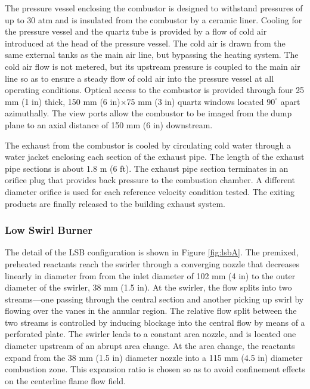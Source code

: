 The pressure vessel enclosing the combustor is designed to withstand pressures of up to 30 atm and is insulated from the combustor by a ceramic liner.
Cooling for the pressure vessel and the quartz tube is provided by a flow of cold air introduced at the head of the pressure vessel.
The cold air is drawn from the same external tanks as the main air line, but bypassing the heating system.
The cold air flow is not metered, but its upstream pressure is coupled to the main air line so as to ensure a steady flow of cold air into the pressure vessel at all operating conditions.
Optical access to the combustor is provided through four 25 mm (1 in) thick, 150 mm (6 in)\(\times\)75 mm (3 in) quartz windows located \(90^\circ\) apart azimuthally.
The view ports allow the combustor to be imaged from the dump plane to an axial distance of 150 mm (6 in) downstream.

The exhaust from the combustor is cooled by circulating cold water through a water jacket enclosing each section of the exhaust pipe.
The length of the exhaust pipe sections is about 1.8 m (6 ft).
The exhaust pipe section terminates in an orifice plug that provides back pressure to the combustion chamber.
A different diameter orifice is used for each reference velocity condition tested.
The exiting products are finally released to the building exhaust system.

\subsubsection{Low Swirl Burner}
\label{subsubsec:configuration-a-low-swirl-burner}



The detail of the LSB configuration is shown in Figure \ref{fig:lsbA}.
The premixed, preheated reactants reach the swirler through a converging nozzle that decreases linearly in diameter from from the inlet diameter of 102 mm (4 in) to the outer diameter of the swirler, 38 mm (1.5 in).
At the swirler, the flow splits into two streams---one passing through the central section and another picking up swirl by flowing over the vanes in the annular region.
The relative flow split between the two streams is controlled by inducing blockage into the central flow by means of a perforated plate.
The swirler leads to a constant area nozzle, and is located one diameter upstream of an abrupt area change.
At the area change, the reactants expand from the 38 mm (1.5 in) diameter nozzle into a 115 mm (4.5 in) diameter combustion zone.
This expansion ratio is chosen so as to avoid confinement effects on the centerline flame flow field.\cite{1998-yegian}

